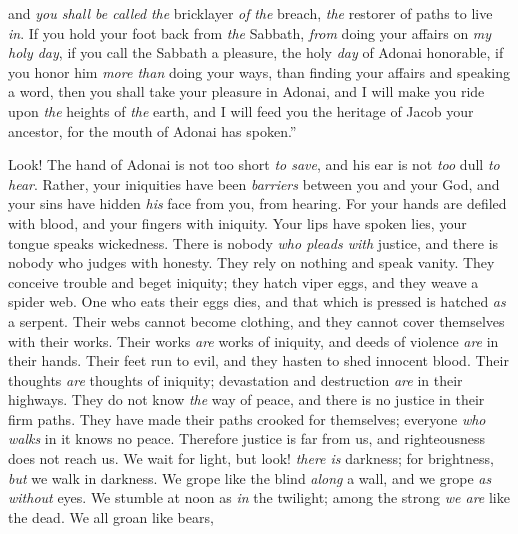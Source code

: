 \begin{biblechapter}
and \textit{you shall be called} \textit{the} bricklayer \textit{of} \textit{the} breach, 
\textit{the} restorer of paths to live \textit{in}.
\verse If you hold your foot back from \textit{the} Sabbath, 
\textit{from} doing your affairs on \textit{my holy day}, 
if you call the Sabbath a pleasure, 
the holy \textit{day} of Adonai honorable, 
if you honor him \textit{more than} doing your ways, 
than finding your affairs and speaking a word,
\verse then you shall take your pleasure in Adonai, 
and I will make you ride upon \textit{the} heights of \textit{the} earth, 
and I will feed you the heritage of Jacob your ancestor, for the mouth of Adonai has spoken.”
\end{biblechapter}

\begin{biblechapter} %
 Look! The hand of Adonai is not too short \textit{to save}, 
and his ear is not \textit{too} dull \textit{to hear}.
\verse Rather, your iniquities have been \textit{barriers} between you and your God, 
and your sins have hidden \textit{his} face from you, from hearing.
\verse For your hands are defiled with blood, 
and your fingers with iniquity. 
Your lips have spoken lies, 
your tongue speaks wickedness.
\verse There is nobody \textit{who pleads with} justice, 
and there is nobody who judges with honesty. 
They rely on nothing 
and speak vanity. 
They conceive trouble 
and beget iniquity;
\verse they hatch viper eggs, 
and they weave a spider web. 
One who eats their eggs dies, 
and that which is pressed is hatched \textit{as} a serpent.
\verse Their webs cannot become clothing, 
and they cannot cover themselves with their works. 
Their works \textit{are} works of iniquity, 
and deeds of violence \textit{are} in their hands.
\verse Their feet run to evil, 
and they hasten to shed innocent blood. 
Their thoughts \textit{are} thoughts of iniquity; 
devastation and destruction \textit{are} in their highways.
\verse They do not know \textit{the} way of peace, 
and there is no justice in their firm paths. 
They have made their paths crooked for themselves; 
everyone \textit{who walks} in it knows no peace.
\verse Therefore justice is far from us, 
and righteousness does not reach us. 
We wait for light, but look! \textit{there is} darkness; 
for brightness, \textit{but} we walk in darkness.
\verse We grope like the blind \textit{along} a wall, 
and we grope \textit{as without} eyes. 
We stumble at noon as \textit{in} the twilight; 
among the strong \textit{we are} like the dead.
\verse We all groan like bears, 

\end{biblechapter}
